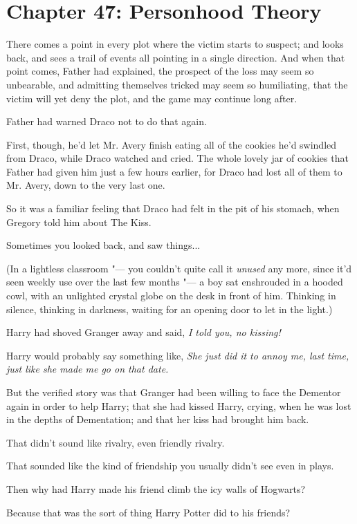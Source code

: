 \chapter{Chapter 47: Personhood Theory}
There comes a point in every plot where the victim starts to suspect;
and looks back, and sees a trail of events all pointing in a single
direction. And when that point comes, Father had explained, the prospect
of the loss may seem so unbearable, and admitting themselves tricked may
seem so humiliating, that the victim will yet deny the plot, and the
game may continue long after.

Father had warned Draco not to do that again.

First, though, he'd let Mr. Avery finish eating all of the cookies he'd
swindled from Draco, while Draco watched and cried. The whole lovely jar
of cookies that Father had given him just a few hours earlier, for Draco
had lost all of them to Mr. Avery, down to the very last one.

So it was a familiar feeling that Draco had felt in the pit of his
stomach, when Gregory told him about The Kiss.

Sometimes you looked back, and saw things...

(In a lightless classroom "--- you couldn't quite call it \emph{unused} any
more, since it'd seen weekly use over the last few months "--- a boy sat
enshrouded in a hooded cowl, with an unlighted crystal globe on the desk
in front of him. Thinking in silence, thinking in darkness, waiting for
an opening door to let in the light.)

Harry had shoved Granger away and said, \emph{I told you, no kissing!}

Harry would probably say something like, \emph{She just did it to annoy
me, last time, just like she made me go on that date.}

But the verified story was that Granger had been willing to face the
Dementor again in order to help Harry; that she had kissed Harry,
crying, when he was lost in the depths of Dementation; and that her kiss
had brought him back.

That didn't sound like rivalry, even friendly rivalry.

That sounded like the kind of friendship you usually didn't see even in
plays.

Then why had Harry made his friend climb the icy walls of Hogwarts?

Because that was the sort of thing Harry Potter did to his friends?

